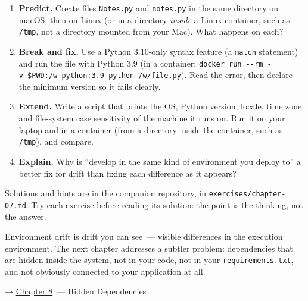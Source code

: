\begin{enumerate}
\def\labelenumi{\arabic{enumi}.}
\tightlist
\item
  \textbf{Predict.} Create files \texttt{Notes.py} and \texttt{notes.py} in the same directory on macOS, then on Linux (or in a directory \emph{inside} a Linux container, such as \texttt{/tmp}, not a directory mounted from your Mac). What happens on each?
\item
  \textbf{Break and fix.} Use a Python 3.10-only syntax feature (a \texttt{match} statement) and run the file with Python 3.9 (in a container: \texttt{docker\ run\ -}\allowbreak{}\texttt{-}\allowbreak{}\texttt{rm\ -}\allowbreak{}\texttt{v\ \$PWD:}\allowbreak{}\texttt{/}\allowbreak{}\texttt{w\ python:}\allowbreak{}\texttt{3.}\allowbreak{}\texttt{9\ python\ /}\allowbreak{}\texttt{w/}\allowbreak{}\texttt{file.}\allowbreak{}\texttt{py}). Read the error, then declare the minimum version so it fails clearly.
\item
  \textbf{Extend.} Write a script that prints the OS, Python version, locale, time zone and file-system case sensitivity of the machine it runs on. Run it on your laptop and in a container (from a directory inside the container, such as \texttt{/tmp}), and compare.
\item
  \textbf{Explain.} Why is ``develop in the same kind of environment you deploy to'' a better fix for drift than fixing each difference as it appears?
\end{enumerate}

\noindent{}Solutions and hints are in the companion repository, in \texttt{exercises/}\allowbreak{}\texttt{chapter-07.md}. Try each exercise before reading its solution: the point is the thinking, not the answer.

\label{07-environment-drift:whats-next}

Environment drift is drift you can see~--- visible differences in the execution environment. The next chapter addresses a subtler problem: dependencies that are hidden inside the system, not in your code, not in your \texttt{requirements.txt}, and not obviously connected to your application at all.

\noindent{}→ \hyperref[ch:08-hidden-dependencies]{Chapter 8}~--- Hidden Dependencies
